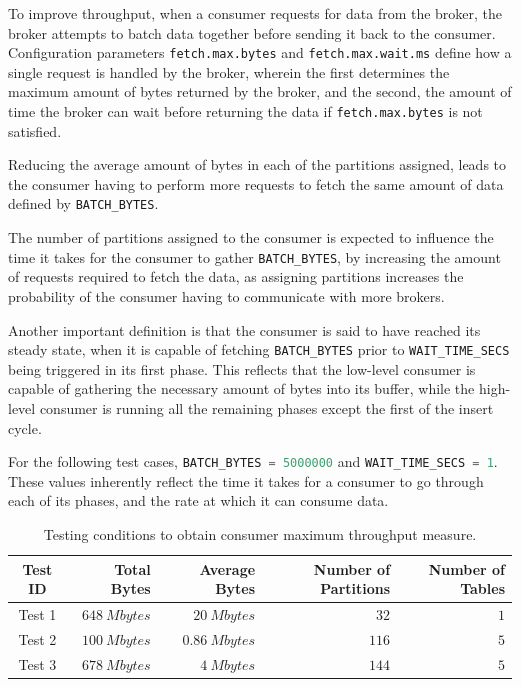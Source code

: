 To improve throughput, when a consumer requests for data from the broker, the
broker attempts to batch data together before sending it back to the consumer.
Configuration parameters \lstinline{fetch.max.bytes} and
\lstinline{fetch.max.wait.ms} define how a single request is handled by the
broker, wherein the first determines the maximum amount of bytes returned by the
broker, and the second, the amount of time the broker can wait before returning
the data if \lstinline{fetch.max.bytes} is not satisfied.

Reducing the average amount of bytes in each of the partitions assigned, leads
to the consumer having to perform more requests to fetch the same amount of data
defined by \lstinline[language=Python]{BATCH_BYTES}. 

The number of partitions assigned to the consumer is expected to influence the
time it takes for the consumer to gather
\lstinline[language=Python]{BATCH_BYTES}, by increasing the amount of requests
required to fetch the data, as assigning partitions increases the probability of
the consumer having to communicate with more brokers. 

Another important definition is that the consumer is said to have reached its
steady state, when it is capable of fetching
\lstinline[language=Python]{BATCH_BYTES} prior to
\lstinline[language=Python]{WAIT_TIME_SECS} being triggered in its first phase.
This reflects that the low-level consumer is capable of gathering the necessary
amount of bytes into its buffer, while the high-level consumer is running all
the remaining phases except the first of the insert cycle.

For the following test cases, \lstinline[language=Python]{BATCH_BYTES = 5000000}
and \lstinline[language=Python]{WAIT_TIME_SECS = 1}.  These values inherently
reflect the time it takes for a consumer to go through each of its phases, and
the rate at which it can consume data.

\begin{table}[htb!] 
\centering 
\caption{
    Testing conditions to obtain consumer maximum throughput measure.
} 
\label{tab:consumer_testing_conditions}
    \begin{tabular}{ |c|r|r|r|r| } 
        \hline
        \textbf{Test ID} & \textbf{Total Bytes} & \textbf{Average Bytes} &
            \textbf{Number of Partitions} & \textbf{Number of Tables} \\ 
        \hline 
        Test 1 & $648\ Mbytes$ & $20\ Mbytes$ & $32$ & $1$ \\ 
        Test 2 & $100\ Mbytes$ & $0.86\ Mbytes$ & $116$ & $5$ \\ 
        Test 3 & $678\ Mbytes$ & $4\ Mbytes$ & $144$ & $5$ \\ 
        \hline
    \end{tabular} 
\end{table}

